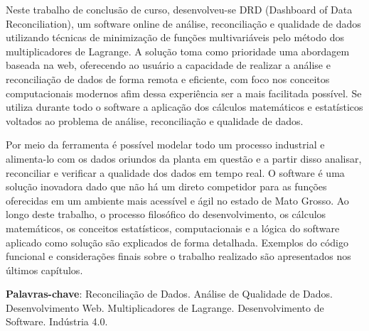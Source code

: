 \setlength{\absparsep}{18pt} %
\begin{resumo}
    \SingleSpacing
    Neste trabalho de conclusão de curso, desenvolveu-se DRD (Dashboard of Data Reconciliation), um software online de análise, reconciliação e qualidade de dados utilizando técnicas de minimização de funções multivariáveis pelo método dos multiplicadores de Lagrange. A solução toma como prioridade uma abordagem baseada na web, oferecendo ao usuário a capacidade de realizar a análise e reconciliação de dados de forma remota e eficiente, com foco nos conceitos computacionais modernos afim dessa experiência ser a mais facilitada possível. Se utiliza durante todo o software a aplicação dos cálculos matemáticos e estatísticos voltados ao problema de análise, reconciliação e qualidade de dados. 
    
    Por meio da ferramenta é possível modelar todo um processo industrial e alimenta-lo com os dados oriundos da planta em questão e a partir disso analisar, reconciliar e verificar a qualidade dos dados em tempo real. O software é uma solução inovadora dado que não há um direto competidor para as funções oferecidas em um ambiente mais acessível e ágil no estado de Mato Grosso. Ao longo deste trabalho, o processo filosófico do desenvolvimento, os cálculos matemáticos, os conceitos estatísticos, computacionais e a lógica do software aplicado como solução são explicados de forma detalhada. Exemplos do código funcional e considerações finais sobre o trabalho realizado são apresentados nos últimos capítulos.
	
    \textbf{Palavras-chave}: Reconciliação de Dados. Análise de Qualidade de Dados. Desenvolvimento Web. Multiplicadores de Lagrange. Desenvolvimento de Software. Indústria 4.0.
\end{resumo}

